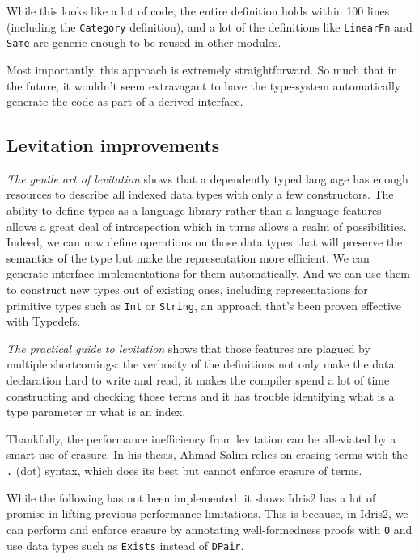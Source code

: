 \documentclass[
]{article}
\begin{document}
While this looks like a lot of code, the entire definition holds within
100 lines (including the \texttt{Category} definition), and a lot of the
definitions like \texttt{LinearFn} and \texttt{Same} are generic enough
to be reused in other modules.

Most importantly, this approach is extremely straightforward. So much
that in the future, it wouldn't seem extravagant to have the type-system
automatically generate the code as part of a derived interface.

\hypertarget{levitation-improvements}{%
\subsection{Levitation improvements}\label{levitation-improvements}}

\emph{The gentle art of levitation}\cite{levitation} shows that a
dependently typed language has enough resources to describe all indexed
data types with only a few constructors. The ability to define types as
a language library rather than a language features allows a great deal
of introspection which in turns allows a realm of possibilities. Indeed,
we can now define operations on those data types that will preserve the
semantics of the type but make the representation more efficient. We can
generate interface implementations for them automatically. And we can
use them to construct new types out of existing
ones\cite{category_of_containers}\cite{delta_for_data}\cite{indexed_containers},
including representations for primitive types such as \texttt{Int} or
\texttt{String}, an approach that's been proven effective with
Typedefs\cite{typedefs}.

\emph{The practical guide to levitation}\cite{guide_to_levitation} shows
that those features are plagued by multiple shortcomings: the verbosity
of the definitions not only make the data declaration hard to write and
read, it makes the compiler spend a lot of time constructing and
checking those terms and it has trouble identifying what is a type
parameter or what is an index.

Thankfully, the performance inefficiency from levitation can be
alleviated by a smart use of erasure. In his thesis, Ahmad Salim relies
on erasing terms with the \texttt{.} (dot) syntax, which does its best
but cannot enforce erasure of terms.

While the following has not been implemented, it shows Idris2 has a lot
of promise in lifting previous performance limitations. This is because,
in Idris2, we can perform and enforce erasure by annotating
well-formedness proofs with \texttt{0} and use data types such as
\texttt{Exists} instead of \texttt{DPair}.
\end{document}
